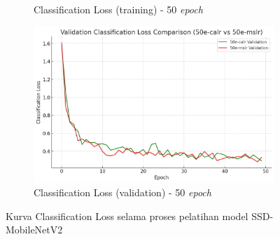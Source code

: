 \begin{figure}[htbp]
\begin{subfigure}{0.45\textwidth}
    \caption{Classification Loss (training) - 50 \emph{epoch}}
  \end{subfigure}
  \hfill
  \begin{subfigure}{0.45\textwidth}
    \includegraphics[width=\textwidth]{gambar/bab4-val-clsloss-50e.png}
    \caption{Classification Loss (validation) - 50 \emph{epoch}}
  \end{subfigure}
  \caption{Kurva Classification Loss selama proses pelatihan model SSD-MobileNetV2}
  \label{fig:classification_loss_curves}
\end{figure}

